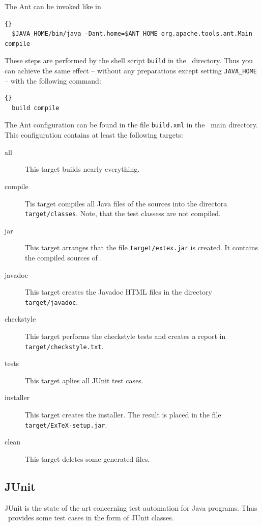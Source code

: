 \documentclass{extex-doc}
\newcommand\File[1]{\texttt{#1}}
\begin{document}
The Ant can be invoked like in

\begin{lstlisting}{}
  $JAVA_HOME/bin/java -Dant.home=$ANT_HOME org.apache.tools.ant.Main compile
\end{lstlisting}

These steps are performed by the shell script \File{build} in the
\ExTeX\ directory. Thus you can achieve the same effect -- without any
preparations except setting \verb|JAVA_HOME| -- with the following command:

\begin{lstlisting}{}
  build compile
\end{lstlisting}

The Ant configuration can be found in the file \File{build.xml} in the
\ExTeX\ main directory. This configuration contains at least the
following targets:

\begin{description}
\item [all] This target builds nearly everything.
\item [compile] Tis target compiles all Java files of the sources into
  the directora \File{target/classes}. Note, that the test classess
  are not compiled.
\item [jar] This target arranges that the file \File{target/extex.jar}
  is created. It contains the compiled sources of  \ExTeX.
\item [javadoc] This target creates the Javadoc HTML files in the
  directory \File{target/javadoc}.
\item [checkstyle] This target performs the checkstyle tests and
  creates a report in \File{target/checkstyle.txt}.
\item [tests] This target aplies all JUnit test cases.
\item [installer] This target creates the installer. The result is
  placed in the file \File{target/ExTeX-setup.jar}.
\item [clean] This target deletes some generated files.
\end{description}


\subsection{JUnit}

JUnit is the state of the art concerning test automation for Java
programs. Thus \ExTeX\ provides some test cases in the form of JUnit
classes.
\end{document}
